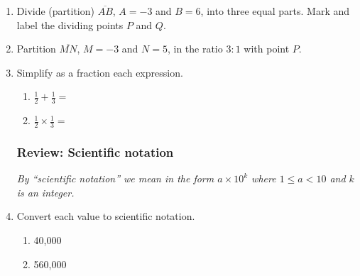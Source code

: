 \begin{enumerate}
\item Divide (partition) $\overline{AB}$, $A=-3$ and $B=6$, into three equal parts. Mark and label the dividing points $P$ and $Q$. \\
    \vspace{0.5cm}

\item Partition $\overline{MN}$, $M=-3$ and $N=5$, in the ratio $3:1$ with point $P$. \\

\newpage
\item Simplify as a fraction each expression.
\begin{multicols}{2}
    \begin{enumerate}[itemsep=1cm]
      \item $\frac{1}{2}+\frac{1}{3}=$
      \item $\frac{1}{2} \times \frac{1}{3}=$
    \end{enumerate}
  \end{multicols} \vspace{1cm}

\subsubsection*{Review: Scientific notation}
\emph{By ``scientific notation'' we mean in the form $a \times 10^{k}$ where $1\leq a <10$ and $k$ is an integer.}
\item Convert each value to scientific notation.
  \begin{multicols}{2}
    \begin{enumerate}[itemsep=1cm]
      \item 40,000
      \item 560,000
    \end{enumerate}
  \end{multicols} \vspace{1cm}


\end{enumerate}
